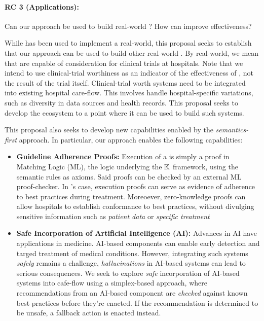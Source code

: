 \paragraph{RC 3 (Applications):} Can our approach be used to build real-world
\CDSSs{}? How can \MediK{} improve \CDSSs{} effectiveness?

While \MediK{} has been used to implement a real-world,
this proposal seeks to establish that our approach can be used to build
other real-world \CDSSs{}. By real-world, we mean \CDSSs{} that are
capable of consideration for clinical trials at hospitals. Note that we
intend to use clinical-trial worthiness as an indicator of the effectiveness
of \MediK{}, not the result of the trial itself.
Clinical-trial worth systems need to be integrated into existing hospital care-flow.
This involves handle hospital-specific variations, such as
diversity in data sources and health records. This proposal seeks to
develop the \MediK{} ecosystem to a point where it can be used to build
such systems.

This proposal also seeks to develop new \CDSS{} capabilities enabled by the
\emph{semantics-first} approach. In particular, our approach
enables the following capabilities:

\begin{itemize}
  \item \textbf{Guideline Adherence Proofs:} Execution of a
\MediK{} \BPG{} is simply a proof in Matching Logic (ML), the logic
underlying the $\mathbb{K}{}$ framework, using the semantic rules as axioms.
Said proofs can be checked by an external ML proof-checker.
In \MediK{}'s case, execution proofs can serve as evidence of adherence to best practices during treatment.
Moreoever, zero-knowledge proofs can allow hospitals to establish
conformance to best practices, without divulging sensitive information
such as \emph{patient data} or \emph{specific treatment}
  \item \textbf{Safe Incorporation of Artificial Intelligence (AI):}
Advances in AI have applications in medicine. AI-based components
can enable early detection and targed treatment of medical conditions.
However, integrating such systems \emph{safely} remains a challenge,
\emph{hallucinations} in AI-based systems can lead to serious consequences.
We seek to explore \emph{safe} incorporation of AI-based systems into cafe-flow using
a simplex-based approach, where recommendations from an AI-based component are
\emph{checked} against known best practices before they're enacted.
If the recommendation is determined to be unsafe, a fallback action is enacted
instead.
\end{itemize}


